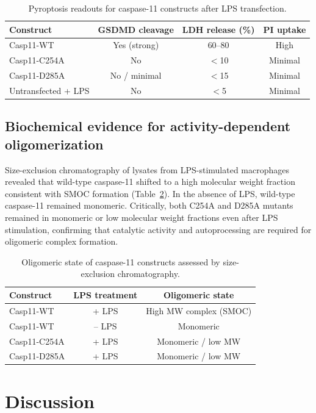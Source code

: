 \documentclass[11pt]{article}
\begin{document}
\begin{table}[h]
\centering
\caption{Pyroptosis readouts for caspase-11 constructs after LPS transfection.}
\label{tab:pyroptosis}
\begin{tabular}{lccc}
\toprule
Construct & GSDMD cleavage & LDH release (\%) & PI uptake \\
\midrule
Casp11-WT & Yes (strong) & 60--80 & High \\
Casp11-C254A & No & $<$10 & Minimal \\
Casp11-D285A & No / minimal & $<$15 & Minimal \\
Untransfected + LPS & No & $<$5 & Minimal \\
\bottomrule
\end{tabular}
\end{table}

\subsection{Biochemical evidence for activity-dependent oligomerization}
Size-exclusion chromatography of lysates from LPS-stimulated macrophages revealed that wild-type caspase-11 shifted to a high molecular weight fraction consistent with SMOC formation (Table~\ref{tab:sec}). In the absence of LPS, wild-type caspase-11 remained monomeric. Critically, both C254A and D285A mutants remained in monomeric or low molecular weight fractions even after LPS stimulation, confirming that catalytic activity and autoprocessing are required for oligomeric complex formation.

\begin{table}[h]
\centering
\caption{Oligomeric state of caspase-11 constructs assessed by size-exclusion chromatography.}
\label{tab:sec}
\begin{tabular}{lcc}
\toprule
Construct & LPS treatment & Oligomeric state \\
\midrule
Casp11-WT & + LPS & High MW complex (SMOC) \\
Casp11-WT & -- LPS & Monomeric \\
Casp11-C254A & + LPS & Monomeric / low MW \\
Casp11-D285A & + LPS & Monomeric / low MW \\
\bottomrule
\end{tabular}
\end{table}

\section{Discussion}
\end{document}
